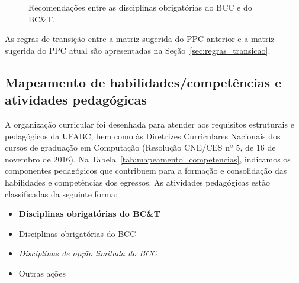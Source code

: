 \begin{figure}
    \centering
    \resizebox{\textwidth}{!}{}
    \caption{Recomendações entre as disciplinas obrigatórias do BCC e do BC\&T.}
    \label{fig:recomendacoes}
\end{figure}

As regras de transição entre a matriz sugerida do PPC anterior e a matriz
sugerida do PPC atual são apresentadas na Seção~\ref{sec:regras_transicao}.

\subsection{Mapeamento de habilidades/competências e atividades pedagógicas}

A organização curricular foi desenhada para atender aos requisitos estruturais
e pedagógicos da UFABC, bem como às Diretrizes Curriculares Nacionais dos
cursos de graduação em Computação (Resolução CNE/CES nº 5, de 16 de novembro de
2016).
Na Tabela~\ref{tab:mapeamento_competencias}, indicamos os componentes
pedagógicos que contribuem para a formação e consolidação das habilidades e
competências dos egressos.
As atividades pedagógicas estão classificadas da seguinte forma:

\newcommand{\obbct}[1]{\textbf{#1}}
\newcommand{\obbcc}[1]{\underline{#1}}
\newcommand{\olbcc}[1]{\textit{#1}}
\newcommand{\outra}[1]{\textrm{#1}}

\begin{itemize}
    \item \obbct{Disciplinas obrigatórias do BC\&T}
    \item \obbcc{Disciplinas obrigatórias do BCC}
    \item \olbcc{Disciplinas de opção limitada do BCC}
    \item \outra{Outras ações}
\end{itemize}



